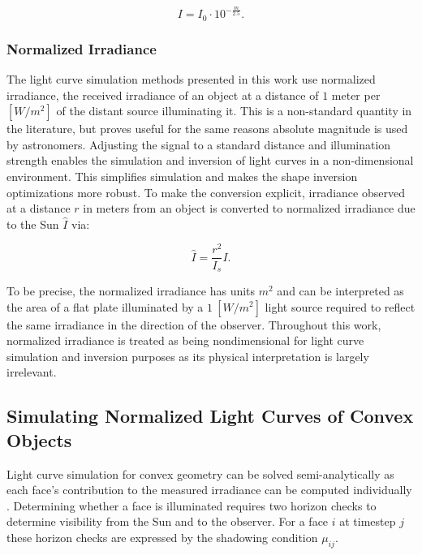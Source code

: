 \begin{equation} \label{eq:mag_to_irradiance}
  I = I_0 \cdot 10^{-\frac{m}{2.5}}.
\end{equation}

\subsubsection{Normalized Irradiance}

The light curve simulation methods presented in this work use normalized irradiance, the received irradiance of an object at a distance of $1$ meter per $\left[ W/m^2 \right]$ of the distant source illuminating it. This is a non-standard quantity in the literature, but proves useful for the same reasons absolute magnitude is used by astronomers. Adjusting the signal to a standard distance and illumination strength enables the simulation and inversion of light curves in a non-dimensional environment. This simplifies simulation and makes the shape inversion optimizations more robust. To make the conversion explicit, irradiance observed at a distance $r$ in meters from an object is converted to normalized irradiance due to the Sun $\hat{I}$ via:

\begin{equation} \label{eq:irradiance_to_norm_irradiance}
  \hat{I} = \frac{r^2}{I_s} I.
\end{equation}

To be precise, the normalized irradiance has units $m^2$ and can be interpreted as the area of a flat plate illuminated by a $1 \: \left[W/m^2\right]$ light source required to reflect the same irradiance in the direction of the observer. Throughout this work, normalized irradiance is treated as being nondimensional for light curve simulation and inversion purposes as its physical interpretation is largely irrelevant.

\subsection{Simulating Normalized Light Curves of Convex Objects}

Light curve simulation for convex geometry can be solved semi-analytically as each face's contribution 
to the measured irradiance can be computed individually \cite{kaasalainen2001}. 
Determining whether a face is illuminated requires two horizon checks to determine visibility 
from the Sun and to the observer. For a face $i$ at timestep $j$ these horizon checks are 
expressed by the shadowing condition $\mu_{ij}$. 

